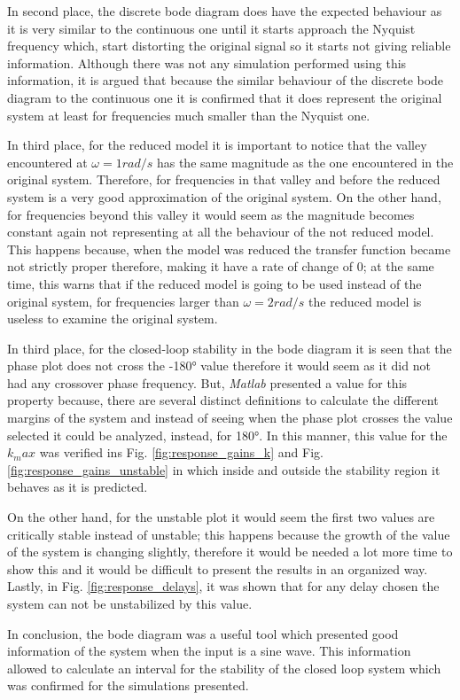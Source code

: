 In second place, the discrete bode diagram does have the expected behaviour as it is very similar to the continuous one until it starts approach the Nyquist frequency which, start distorting the original signal so it starts not giving reliable information. Although there was not any simulation performed using this information, it is argued that because the similar behaviour of the discrete bode diagram to the continuous one it is confirmed that it does represent the original system at least for frequencies much smaller than the Nyquist one.

In third place, for the reduced model it is important to notice that the valley encountered at $\omega = 1 rad/s$ has the same magnitude as the one encountered in the original system. Therefore, for frequencies in that valley and before the reduced system is a very good approximation of the original system. On the other hand, for frequencies beyond this valley it would seem as the magnitude becomes constant again not representing at all the behaviour of the not reduced model. This happens because, when the model was reduced the transfer function became not strictly proper therefore, making it have a rate of change of 0; at the same time, this warns that if the reduced model is going to be used instead of the original system, for frequencies larger than $\omega = 2 rad/s$ the reduced model is useless to examine the original system.

In third place, for the closed-loop stability in the bode diagram it is seen that the phase plot does not cross the -180° value therefore it would seem as it did not had any crossover phase frequency. But, \textit{Matlab} presented a value for this property because, there are several distinct definitions to calculate the different margins of the system and instead of seeing when the phase plot crosses the value selected it could be analyzed, instead, for 180°. In this manner, this value for the $k_max$ was verified ins Fig. \ref{fig:response_gains_k} and Fig. \ref{fig:response_gains_unstable} in which inside and outside the stability region it behaves as it is predicted. 

On the other hand, for the unstable plot it would seem the first two values are critically stable instead of unstable; this happens because the growth of the value of the system is changing slightly, therefore it would be needed a lot more time to show this and it would be difficult to present the results in an organized way. Lastly, in Fig. \ref{fig:response_delays}, it was shown that for any delay chosen the system can not be unstabilized by this value.

In conclusion, the bode diagram was a useful tool which presented good information of the system when the input is a sine wave. This information allowed to calculate an interval for the stability of the closed loop system which was confirmed for the simulations presented.